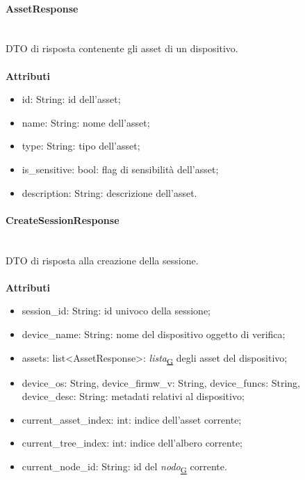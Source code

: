 \documentclass[a4paper,12pt]{article}
\begin{document}
                \paragraph{AssetResponse}\mbox{}\\
                    DTO di risposta contenente gli asset di un dispositivo.\\\\
                    \textbf{Attributi}
                    \begin{itemize}
                        \item {\ttfamily id: String}: id dell'asset;
                        \item {\ttfamily name: String}: nome dell'asset;
                        \item {\ttfamily type: String}: tipo dell'asset;
                        \item {\ttfamily is\_sensitive: bool}: flag di sensibilità dell'asset;
                        \item {\ttfamily description: String}: descrizione dell'asset.
                    \end{itemize}

                \paragraph{CreateSessionResponse}\mbox{}\\
                    DTO di risposta alla creazione della sessione.\\\\
                    \textbf{Attributi}
                    \begin{itemize}
                        \item {\ttfamily session\_id: String}: id univoco della sessione;
                        \item {\ttfamily device\_name: String}: nome del dispositivo oggetto di verifica;
                        \item {\ttfamily assets: list<AssetResponse>}: \textit{lista}\textsubscript{\href{https://atlasteam9.github.io/Atlas/glossario.html\#Lista}{G}} degli asset del dispositivo;
                        \item {\ttfamily device\_os: String}, {\ttfamily device\_firmw\_v: String}, {\ttfamily device\_funcs: String}, {\ttfamily device\_desc: String}: metadati relativi al dispositivo;
                        \item {\ttfamily current\_asset\_index: int}: indice dell'asset corrente;
                        \item {\ttfamily current\_tree\_index: int}: indice dell'albero corrente;
                        \item {\ttfamily current\_node\_id: String}: id del \textit{nodo}\textsubscript{\href{https://atlasteam9.github.io/Atlas/glossario.html\#Nodo}{G}} corrente.
                    \end{itemize}
\end{document}
